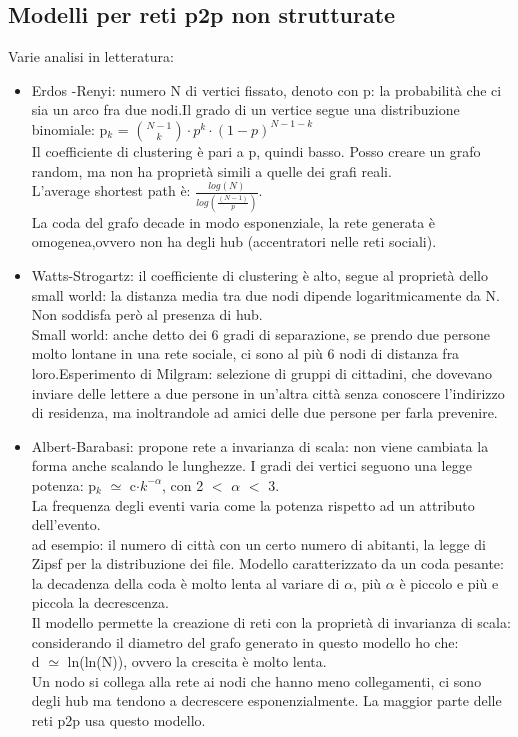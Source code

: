 \documentclass[16px]{article}
\begin{document}
\subsection{Modelli per reti p2p non strutturate}
Varie analisi in letteratura:
\begin{itemize}
\item Erdos -Renyi: numero N di vertici fissato, denoto con p: la probabilità che ci sia un arco fra due nodi.Il grado di un vertice segue una distribuzione binomiale: p$_{k}$ = $\binom{N-1}{k}\cdot p^{k}\cdot(1-p)^{N-1-k}$\\ Il coefficiente di clustering è pari a p, quindi basso. Posso creare un grafo random, ma non ha proprietà simili a quelle dei grafi reali.\\ L'average shortest path è: $\frac{log(N)}{log(\frac{(N-1)}{p})}$.\\ La coda del grafo decade in modo esponenziale, la rete generata è omogenea,ovvero non ha degli hub (accentratori nelle reti sociali).
\item Watts-Strogartz: il coefficiente di clustering è alto, segue al proprietà dello small world: la distanza media tra due nodi dipende logaritmicamente da N.\\ Non soddisfa però al presenza di hub.\\ Small world: anche detto dei 6 gradi di separazione, se prendo due persone molto lontane in una rete sociale, ci sono al più 6 nodi di distanza fra loro.Esperimento di Milgram: selezione di gruppi di cittadini, che dovevano inviare delle lettere a due persone in un'altra città senza conoscere l'indirizzo di residenza, ma inoltrandole ad amici
delle due persone per farla prevenire.
\item Albert-Barabasi: propone rete a invarianza di scala: non viene cambiata la forma anche scalando le lunghezze. I gradi dei vertici seguono una legge potenza: p$_{k}$ $\simeq$ c$\cdot k^{-\alpha}$, con 2 $<$ $\alpha$ $<$ 3.\\ La frequenza degli eventi varia come la potenza rispetto ad un attributo dell'evento.\\ ad esempio: il numero di città con un certo numero di abitanti, la legge di Zipsf per la distribuzione dei file. Modello caratterizzato da un coda pesante: la decadenza della coda è molto lenta al variare di $\alpha$, più $\alpha$ è piccolo e più e piccola la decrescenza.\\ Il modello permette la creazione di reti con la proprietà di invarianza di scala: considerando il diametro del grafo generato in questo modello ho che:\\
d $\simeq$ ln(ln(N)), ovvero la crescita è molto lenta.\\ Un nodo si collega alla rete ai nodi che hanno meno collegamenti, ci sono degli hub ma tendono a decrescere esponenzialmente. La maggior parte delle reti p2p usa questo modello.
\end{itemize}
\end{document}
